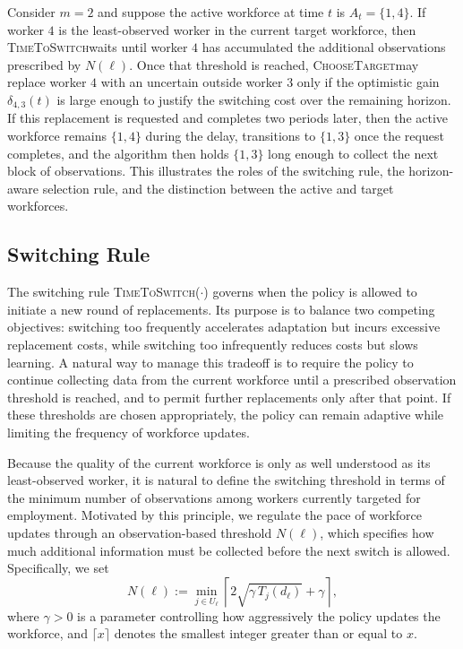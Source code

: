 \documentclass[opre,blindrev]{informs3}
\newcommand{\TimeToSwitch}{\textsc{TimeToSwitch}}
\newcommand{\ChooseTarget}{\textsc{ChooseTarget}}
\begin{document}
\begin{remark}
    Consider \(m=2\) and suppose the active workforce at time \(t\) is \(A_t=\{1,4\}\). If worker \(4\) is the least-observed worker in the current target workforce, then \TimeToSwitch waits until worker \(4\) has accumulated the additional observations prescribed by \(N(\ell)\). Once that threshold is reached, \ChooseTarget may replace worker \(4\) with an uncertain outside worker \(3\) only if the optimistic gain \(\delta_{4,3}(t)\) is large enough to justify the switching cost over the remaining horizon. If this replacement is requested and completes two periods later, then the active workforce remains \(\{1,4\}\) during the delay, transitions to \(\{1,3\}\) once the request completes, and the algorithm then holds \(\{1,3\}\) long enough to collect the next block of observations. This illustrates the roles of the switching rule, the horizon-aware selection rule, and the distinction between the active and target workforces.
\end{remark}

\vspace{-.1in}
\subsection{Switching Rule}

The switching rule \TimeToSwitch(\(\cdot\)) governs when the policy is allowed to initiate a new round of replacements. Its purpose is to balance two competing objectives: switching too frequently accelerates adaptation but incurs excessive replacement costs, while switching too infrequently reduces costs but slows learning. A natural way to manage this tradeoff is to require the policy to continue collecting data from the current workforce until a prescribed observation threshold is reached, and to permit further replacements only after that point. If these thresholds are chosen appropriately, the policy can remain adaptive while limiting the frequency of workforce updates.

Because the quality of the current workforce is only as well understood as its least-observed worker, it is natural to define the switching threshold in terms of the minimum number of observations among workers currently targeted for employment. Motivated by this principle, we regulate the pace of workforce updates through an observation-based threshold \(N(\ell)\), which specifies how much additional information must be collected before the next switch is allowed. Specifically, we set
\begin{equation}\label{eq:block-threshold}
    N(\ell)
    :=
    \min_{j \in U_\ell}
    \left\lceil 2\sqrt{\gamma\, T_j(d_\ell)} + \gamma \right\rceil,
\end{equation}
where \(\gamma > 0\) is a parameter controlling how aggressively the policy updates the workforce, and \(\lceil x \rceil\) denotes the smallest integer greater than or equal to \(x\).
\end{document}
